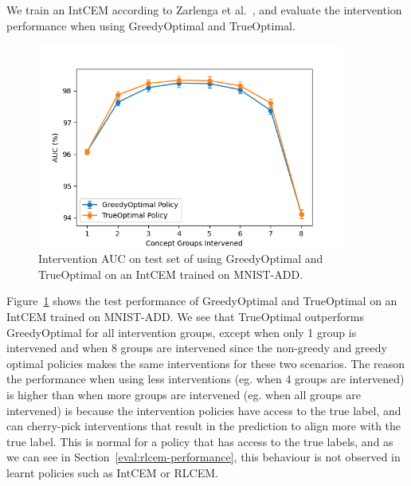 We train an IntCEM according to Zarlenga et al.~\cite{intcem}, 
and evaluate the intervention performance when using
GreedyOptimal and TrueOptimal. 

\begin{figure}[!h]
    \centering
    \includegraphics[width=0.9\textwidth]{figs/evaluation/greedy_vs_true_optimal.png}
    \caption{
        Intervention AUC on test set of using GreedyOptimal and TrueOptimal
        on an IntCEM trained on MNIST-ADD.
    }
    \label{fig:greedy-vs-optimal}
\end{figure}

Figure~\ref{fig:greedy-vs-optimal} shows the test performance of 
GreedyOptimal and TrueOptimal on an IntCEM
trained on MNIST-ADD. We see that TrueOptimal outperforms 
GreedyOptimal for all intervention groups, except
when only 1 group is intervened and when 8 groups are intervened
since the non-greedy and greedy optimal policies 
makes the same interventions for these two scenarios. 
The reason the performance when using
less interventions (eg. when 4 groups are intervened) is higher than
when more groups are intervened (eg. when all groups are intervened)
is because the intervention policies have access to the true 
label, and can cherry-pick interventions that result in 
the prediction to align more with the true label. This is
normal for a policy that has access to the 
true labels, and as we can see in 
Section~\ref{eval:rlcem-performance}, this behaviour is not observed 
in learnt policies such as IntCEM or RLCEM.


        

